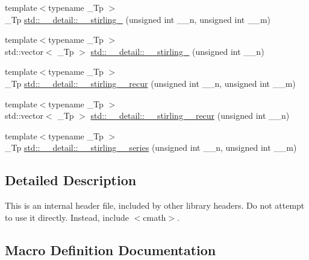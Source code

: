 \begin{DoxyCompactItemize}
\item 
{\footnotesize template$<$typename \+\_\+\+Tp $>$ }\\\+\_\+\+Tp \hyperlink{namespacestd_1_1____detail_a4589d459a7a9d1d9e19b33601238a4af}{std\+::\+\_\+\+\_\+detail\+::\+\_\+\+\_\+stirling\+\_} (unsigned int \+\_\+\+\_\+n, unsigned int \+\_\+\+\_\+m)
\item 
{\footnotesize template$<$typename \+\_\+\+Tp $>$ }\\std\+::vector$<$ \+\_\+\+Tp $>$ \hyperlink{namespacestd_1_1____detail_a286c6f5a5de7aa8493aa5a8bf491b26e}{std\+::\+\_\+\+\_\+detail\+::\+\_\+\+\_\+stirling\+\_} (unsigned int \+\_\+\+\_\+n)
\item 
{\footnotesize template$<$typename \+\_\+\+Tp $>$ }\\\+\_\+\+Tp \hyperlink{namespacestd_1_1____detail_a23c6eb236cd8ddcfbe43e66ac23324db}{std\+::\+\_\+\+\_\+detail\+::\+\_\+\+\_\+stirling\+\_\+\_\+recur} (unsigned int \+\_\+\+\_\+n, unsigned int \+\_\+\+\_\+m)
\item 
{\footnotesize template$<$typename \+\_\+\+Tp $>$ }\\std\+::vector$<$ \+\_\+\+Tp $>$ \hyperlink{namespacestd_1_1____detail_aa7c6f36dc1f75cd38af10ca232e62f06}{std\+::\+\_\+\+\_\+detail\+::\+\_\+\+\_\+stirling\+\_\+\_\+recur} (unsigned int \+\_\+\+\_\+n)
\item 
{\footnotesize template$<$typename \+\_\+\+Tp $>$ }\\\+\_\+\+Tp \hyperlink{namespacestd_1_1____detail_a8408f17699eb43a14447c7e4795b277f}{std\+::\+\_\+\+\_\+detail\+::\+\_\+\+\_\+stirling\+\_\+\_\+series} (unsigned int \+\_\+\+\_\+n, unsigned int \+\_\+\+\_\+m)
\end{DoxyCompactItemize}


\subsection{Detailed Description}
This is an internal header file, included by other library headers. Do not attempt to use it directly. Instead, include $<$cmath$>$. 

\subsection{Macro Definition Documentation}
\mbox{\label{sf__stirling_8tcc_aa674f8ec509063cf88851a6ee6e72bc5}} 
